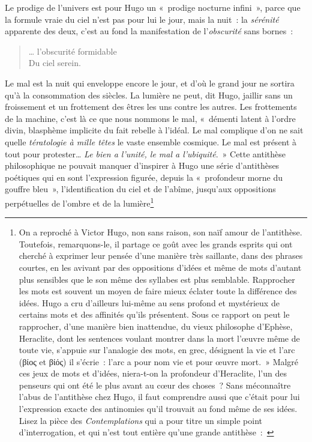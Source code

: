 \documentclass[french,twoside]{book} %
\begin{document}
\noindent Le prodige de l’univers est pour Hugo un « prodige nocturne infini », parce que la formule vraie du ciel n’est pas pour lui le jour, mais la nuit : la \emph{sérénité} apparente des deux, c’est au fond la manifestation de l’\emph{obscurité} sans bornes :\par


\begin{verse}
… l’obscurité formidable\\
Du ciel serein.\\
\end{verse}

\noindent Le mal est la nuit qui enveloppe encore le jour, et d’où le grand jour ne sortira qu’à la consommation des siècles. La lumière ne peut, dit Hugo, jaillir sans un froissement et un frottement des êtres les uns contre les autres. Les frottements de la machine, c’est là ce que nous nommons le mal, « démenti latent à l’ordre divin, blasphème implicite du fait rebelle à l’idéal. Le mal complique d’on ne sait quelle \emph{tératologie à mille têtes} le vaste ensemble cosmique. Le mal est présent à tout pour protester… \emph{Le bien a l’unité, le mal a l’ubiquité}. » Cette antithèse philosophique ne pouvait manquer d’inspirer à Hugo une série d’antithèses poétiques qui en sont l’expression figurée, depuis la « profondeur morne du gouffre bleu », l’identification du ciel et de l’abîme, jusqu’aux oppositions perpétuelles de l’ombre et de la lumière\footnote{\noindent On a reproché à Victor Hugo, non sans raison, son naïf amour de l’antithèse. Toutefois, remarquons-le, il partage ce goût avec les grands esprits qui ont cherché à exprimer leur pensée d’une manière très saillante, dans des phrases courtes, en les avivant par des oppositions d’idées et même de mots d’autant plus sensibles que le son même des syllabes est plus semblable. Rapprocher les mots est souvent un moyen de faire mieux éclater toute la différence des idées. Hugo a cru d’ailleurs lui-même au sens profond et mystérieux de certains mots et des affinités qu’ils présentent. Sous ce rapport on peut le rapprocher, d’une manière bien inattendue, du vieux philosophe d’Ephèse, Heraclite, dont les sentences voulant montrer dans la mort l’œuvre même de toute vie, s’appuie sur l’analogie des mots, en grec, désignent la vie et l’arc (βίος et βίός) il s’écrie : l’arc a pour nom vie et pour œuvre mort. » Malgré ces jeux de mots et d’idées, niera-t-on la profondeur d’Heraclite, l’un des penseurs qui ont été le plus avant au cœur des choses ? Sans méconnaître l’abus de l’antithèse chez Hugo, il faut comprendre aussi que c’était pour lui l’expression exacte des antinomies qu’il trouvait au fond même de ses idées. Lisez la pièce des \emph{Contemplations} qui a pour titre un simple point d’interrogation, et qui n’est tout entière qu’une grande antithèse : \par
}
\end{document}
